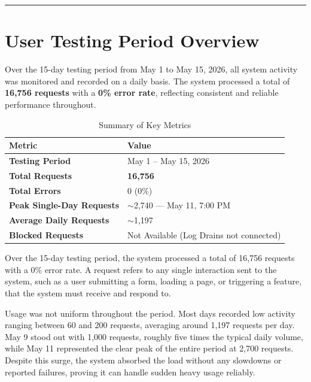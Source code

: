 \documentclass[12pt, a4paper]{article}
\begin{document}



\vspace{1em}
\hrule
\vspace{2em}


\section{User Testing Period Overview}

Over the 15-day testing period from May 1 to May 15, 2026, all system
activity was monitored and recorded on a daily basis. The system
processed a total of \textbf{16,756 requests} with a \textbf{0\% error
rate}, reflecting consistent and reliable performance throughout.

\vspace{1em}

\begin{table}[H]
\centering
\renewcommand{\arraystretch}{1.4}
\begin{tabularx}{\textwidth}{|>{\bfseries}X|X|}
\hline
\textbf{Metric} & \textbf{Value} \\
\hline
Testing Period & May 1 -- May 15, 2026 \\
\hline
Total Requests & \textbf{16,756} \\
\hline
Total Errors & 0 (0\%) \\
\hline
Peak Single-Day Requests & $\sim$2,740 --- May 11, 7:00 PM \\
\hline
Average Daily Requests & $\sim$1,197 \\
\hline
Blocked Requests & Not Available (Log Drains not connected) \\
\hline
\end{tabularx}
\caption{Summary of Key Metrics}
\end{table}


Over the 15-day testing period, the system processed a total of 16,756 requests with a 0\% error rate. A request refers to any single interaction sent to the system, such as a user submitting a form, loading a page, or triggering a feature, that the system must receive and respond to.

Usage was not uniform throughout the period. Most days recorded low activity ranging between 60 and 200 requests, averaging around 1,197 requests per day. May 9 stood out with 1,000 requests, roughly five times the typical daily volume, while May 11 represented the clear peak of the entire period at 2,700 requests. Despite this surge, the system absorbed the load without any slowdowns or reported failures, proving it can handle sudden heavy usage reliably.
\end{document}
